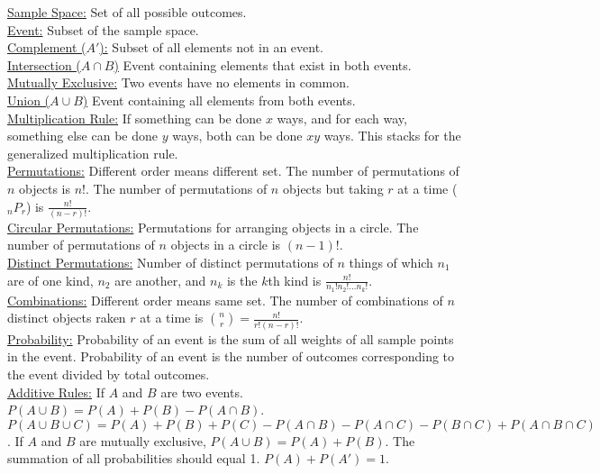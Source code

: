 \documentclass[9pt]{article}
\begin{document}
        \begin{multicols}{2}
            \noindent\underline{Sample Space:} Set of all possible outcomes.\\
            \underline{Event:} Subset of the sample space.\\
            \underline{Complement ($A'$):} Subset of all elements not in an event.\\
            \underline{Intersection ($A\cap B$)} Event containing elements that exist in both events.\\
            \underline{Mutually Exclusive:} Two events have no elements in common.\\
            \underline{Union ($A\cup B$)} Event containing all elements from both events.\\
            \underline{Multiplication Rule:} If something can be done $x$ ways, and for each way, something else can be done $y$ ways, both can be done $xy$ ways. This stacks for the generalized multiplication rule.\\
            \underline{Permutations:} Different order means different set. The number of permutations of $n$ objects is $n!$. The number of permutations of $n$ objects but taking $r$ at a time ($_nP_r$) is $\frac{n!}{(n-r)!}$.\\
            \underline{Circular Permutations:} Permutations for arranging objects in a circle. The number of permutations of $n$ objects in a circle is $(n-1)!$.\\
            \underline{Distinct Permutations:} Number of distinct permutations of $n$ things of which $n_1$ are of one kind, $n_2$ are another, and $n_k$ is the $k$th kind is $\frac{n!}{n_1!n_2!...n_k!}$.\\
            \underline{Combinations:} Different order means same set. The number of combinations of $n$ distinct objects raken $r$ at a time is $\binom{n}{r} = \frac{n!}{r!(n-r)!}$.\\
            \underline{Probability:} Probability of an event is the sum of all weights of all sample points in the event. Probability of an event is the number of outcomes corresponding to the event divided by total outcomes.\\
            \underline{Additive Rules:} If $A$ and $B$ are two events. $P(A\cup B) = P(A) + P(B) - P(A\cap B)$. $P(A\cup B\cup C) = P(A)+P(B)+P(C)-P(A\cap B) - P(A\cap C) - P(B\cap C) + P(A\cap B\cap C)$. If $A$ and $B$ are mutually exclusive, $P(A\cup B) = P(A) + P(B)$. The summation of all probabilities should equal 1. $P(A) + P(A') = 1$.\\

\end{multicols}
\end{document}

